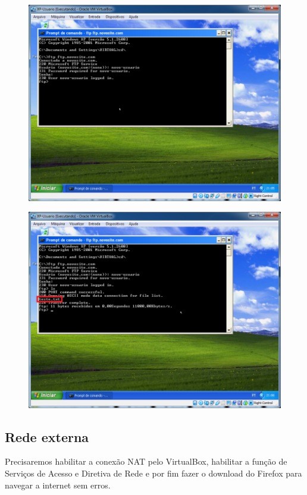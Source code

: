 \documentclass[10pt]{article}
\begin{document}
\begin{figure}[H]
    \centering
    \caption{}
    \label{fig:5422}
    \includegraphics[width=\linewidth]{images/windows_server/ftp/029.png}
\end{figure}
\begin{figure}[H]
    \centering
    \caption{}
    \label{fig:5423}
    \includegraphics[width=\linewidth]{images/windows_server/ftp/033.png}
\end{figure}

\subsection{Rede externa}
Precisaremos habilitar a conexão NAT pelo VirtualBox, habilitar a função de Serviços de Acesso e Diretiva de Rede e por fim fazer o download do Firefox para navegar a internet sem erros. 
\end{document}
